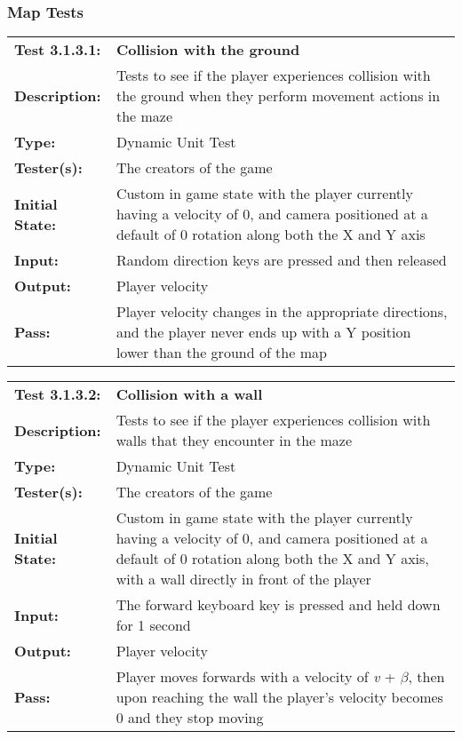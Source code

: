 \documentclass[12pt, titlepage]{article}
\begin{document}
\subsubsection{Map Tests}
\begin{mdframed}[linewidth=1pt]
\begin{tabularx}{\textwidth}{@{}p{3cm}X@{}}
{\bf Test 3.1.3.1:} & {\bf Collision with the ground}\\[\baselineskip]
{\bf Description:} & Tests to see if the player experiences collision with the ground when they perform movement actions in the maze\\[0.5\baselineskip]
{\bf Type:} & Dynamic Unit Test\\[0.5\baselineskip]
{\bf Tester(s):} & The creators of the game\\[0.5\baselineskip]
{\bf Initial State:} & Custom in game state with the player currently having a velocity of 0, and camera positioned at a default of 0 rotation along both the X and Y axis\\[0.5\baselineskip]
{\bf Input:} & Random direction keys are pressed and then released \\[0.5\baselineskip]
{\bf Output:} & Player velocity\\[0.5\baselineskip]
{\bf Pass:} & Player velocity changes in the appropriate directions, and the player never ends up with a Y position lower than the ground of the map
\end{tabularx}
\end{mdframed}

\begin{mdframed}[linewidth=1pt]
\begin{tabularx}{\textwidth}{@{}p{3cm}X@{}}
{\bf Test 3.1.3.2:} & {\bf Collision with a wall}\\[\baselineskip]
{\bf Description:} & Tests to see if the player experiences collision with walls that they encounter in the maze\\[0.5\baselineskip]
{\bf Type:} & Dynamic Unit Test\\[0.5\baselineskip]
{\bf Tester(s):} & The creators of the game\\[0.5\baselineskip]
{\bf Initial State:} & Custom in game state with the player currently having a velocity of 0, and camera positioned at a default of 0 rotation along both the X and Y axis, with a wall directly in front of the player\\[0.5\baselineskip]
{\bf Input:} & The forward keyboard key is pressed and held down for 1 second \\[0.5\baselineskip]
{\bf Output:} & Player velocity\\[0.5\baselineskip]
{\bf Pass:} & Player moves forwards with a velocity of \textit{v} + $\beta$, then upon reaching the wall the player's velocity becomes 0 and they stop moving
\end{tabularx}
\end{mdframed}
\end{document}
